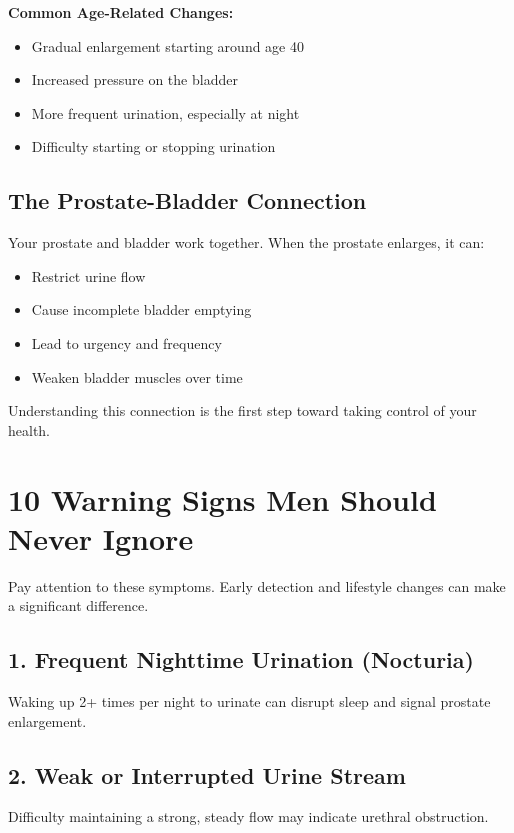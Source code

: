 \documentclass[11pt,oneside,openany]{book}
\begin{document}
\textbf{Common Age-Related Changes:}
\begin{itemize}[leftmargin=*]
\item Gradual enlargement starting around age 40
\item Increased pressure on the bladder
\item More frequent urination, especially at night
\item Difficulty starting or stopping urination
\end{itemize}

\section*{The Prostate-Bladder Connection}

Your prostate and bladder work together. When the prostate enlarges, it can:
\begin{itemize}[leftmargin=*]
\item Restrict urine flow
\item Cause incomplete bladder emptying
\item Lead to urgency and frequency
\item Weaken bladder muscles over time
\end{itemize}

Understanding this connection is the first step toward taking control of your health.

\clearpage

\chapter*{10 Warning Signs Men Should Never Ignore}

Pay attention to these symptoms. Early detection and lifestyle changes can make a significant difference.

\section*{1. Frequent Nighttime Urination (Nocturia)}
Waking up 2+ times per night to urinate can disrupt sleep and signal prostate enlargement.

\section*{2. Weak or Interrupted Urine Stream}
Difficulty maintaining a strong, steady flow may indicate urethral obstruction.
\end{document}
